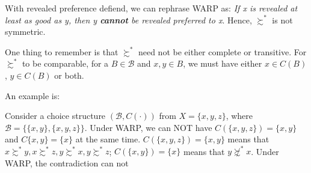 With revealed preference defiend, we can rephrase WARP as: \textit{If x is revealed at least as good as y, then y \textbf{cannot} be revealed preferred to x}. Hence, $\succsim^*$ is not symmetric.

One thing to remember is that $\succsim^*$ need not be either complete or transitive. For $\succsim^*$ to be comparable, for a $B\in\mathcal{B}$ and $x,y\in B$, we must have either $x\in C(B)$, $y\in C(B)$ or both.

An example is:
\begin{example}
    Consider a choice structure $(\mathcal{B},C(\cdot))$ from $X=\{x,y,z\}$, where $\mathcal{B}=\{\{x,y\},\{x,y,z\}\}$. Under WARP, we can NOT have $C(\{x,y,z\})=\{x,y\}$ and $C\{x,y\}=\{x\}$ at the same time.
    $C(\{x,y,z\})=\{x,y\}$ means that $x\succsim^* y,x\succsim^* z,y\succsim^* x, y\succsim^* z$; $C(\{x,y\})=\{x\}$ means that $y\not\succsim^* x$. Under WARP, the contradiction can not 
\end{example}